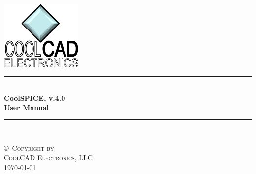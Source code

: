 \begin{titlepage}

\newcommand{\HRule}{\rule{\linewidth}{0.5mm}}
\begin{center}

\includegraphics[width=0.3\textwidth]{./figures/overall_figures/CoolCAD_logo.png}~\\[2.5cm]

\HRule \\[0.4cm]
{ \huge \bfseries CoolSPICE, v.4.0 \\}
{ \huge \bfseries User Manual \\ }
\vspace{0.5cm}
\HRule \\[1.5cm]





\vfill

\textsc{\copyright \hbox{ }Copyright by\\ \LARGE  CoolCAD Electronics, LLC}\\[1cm]
{\large \today}


\end{center}
\end{titlepage}